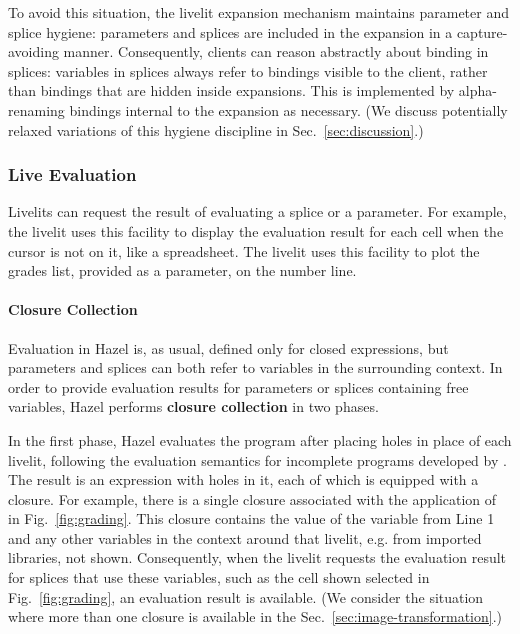 To avoid this situation, the livelit expansion mechanism 
maintains parameter and splice hygiene: parameters and splices are included in the expansion 
in a capture-avoiding manner.
Consequently, clients can reason abstractly about binding in splices: variables in splices
always refer to bindings visible to the client, rather than bindings that are hidden inside expansions.
This is implemented by alpha-renaming bindings internal to the expansion as necessary.
(We discuss potentially relaxed variations of this hygiene discipline in Sec.~\ref{sec:discussion}.)

\subsubsection{Live Evaluation}\label{sec:live-evaluation}
Livelits can request the result of evaluating a splice or a parameter. 
For example, the  livelit uses this facility to display
the evaluation result for each cell when the cursor is not on it, like a spreadsheet.
The  livelit uses this facility to plot the grades list, provided
as a parameter, on the number line. 

\paragraph{Closure Collection} Evaluation in Hazel is, as usual, defined only for closed expressions, 
but parameters and splices can both refer to variables in the surrounding
context. In order to provide evaluation results for parameters or splices containing free variables, 
Hazel performs \textbf{closure collection} in two phases.

In the first phase, Hazel evaluates the program after placing holes in place of each livelit, 
following the evaluation semantics for incomplete programs developed by \citet{HazelnutLive}. 
The result is an expression with holes in it, each of which is equipped with a closure. 
For example, there is a single closure associated with the application of  in Fig.~\ref{fig:grading}.
This closure contains the value of the  variable from Line 1 and any other variables in the context 
around that livelit, e.g. 
from imported libraries, not shown. Consequently, when the livelit requests the evaluation result for
splices that use these variables, such as the cell shown selected in Fig.~\ref{fig:grading}, 
an evaluation result is available. (We consider the situation where more than one closure is available
in the Sec.~\ref{sec:image-transformation}.)

